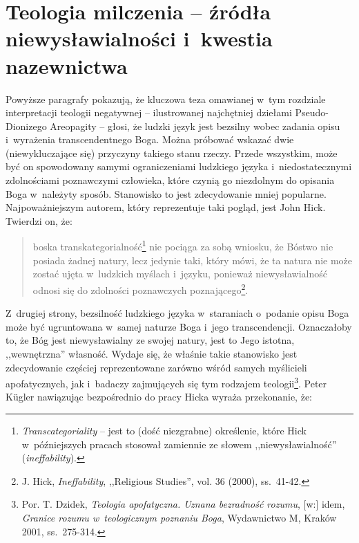 \section{Teologia milczenia -- źródła niewysławialności i~kwestia nazewnictwa}\label{sil-int-nazw}

Powyższe paragrafy pokazują, że kluczowa teza omawianej w~tym rozdziale interpretacji teologii negatywnej -- ilustrowanej najchętniej dziełami Pseudo-Dionizego Areopagity -- głosi, że ludzki język jest bezsilny wobec zadania opisu i~wyrażenia transcendentnego Boga. Można próbować wskazać dwie (niewykluczające się) przyczyny takiego stanu rzeczy. Przede wszystkim, może być on spowodowany samymi ograniczeniami ludzkiego języka i~niedostatecznymi zdolnościami poznawczymi człowieka, które czynią go niezdolnym do opisania Boga w~należyty sposób. Stanowisko to jest zdecydowanie mniej popularne. Najpoważniejszym autorem, który reprezentuje taki pogląd, jest John Hick. Twierdzi on, że:

\begin{quote}
boska transkategorialność\footnote{\textit{Transcategoriality} -- jest to (dość niezgrabne) określenie, które Hick w~późniejszych pracach stosował zamiennie ze słowem ,,niewysławialność'' (\textit{ineffability}).} nie pociąga za sobą wniosku, że Bóstwo nie posiada żadnej natury, lecz jedynie taki, który mówi, że ta natura nie może zostać ujęta w~ludzkich myślach i~języku, ponieważ niewysławialność odnosi się do zdolności poznawczych poznającego\footnote{J. Hick, \textit{Ineffability}, ,,Religious Studies'', vol. 36 (2000), ss.~41-42.}.
\end{quote}

Z~drugiej strony, bezsilność ludzkiego języka w~staraniach o~podanie opisu Boga może być ugruntowana w~samej naturze Boga i~jego transcendencji. Oznaczałoby to, że Bóg jest niewysławialny ze swojej natury, jest to Jego istotna, ,,wewnętrzna'' własność. Wydaje się, że właśnie takie stanowisko jest zdecydowanie częściej reprezentowane zarówno wśród samych myślicieli apofatycznych, jak i~badaczy zajmujących się tym rodzajem teologii\footnote{Por. T. Dzidek, \textit{Teologia apofatyczna. Uznana bezradność rozumu}, [w:] idem, \textit{Granice rozumu w~teologicznym poznaniu Boga}, Wydawnictwo M, Kraków 2001, ss.~275-314.}. Peter Kügler nawiązując bezpośrednio do pracy Hicka wyraża przekonanie, że:

